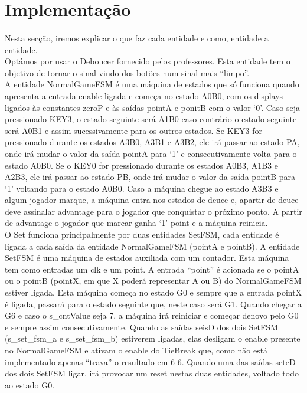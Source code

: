 \documentclass[a4paper, 11pt, oneside]{report}
\begin{document}
\section{Implementação}

\paragraph{} Nesta secção, iremos explicar o que faz cada entidade e como, entidade a entidade. \\
\indent Optámos por usar o Deboucer fornecido pelos professores. Esta entidade tem o objetivo de tornar o sinal vindo dos botões num sinal mais “limpo”. \\
\indent A entidade NormalGameFSM é uma máquina de estados que só funciona quando apresenta a entrada enable ligada e começa no estado A0B0, com os displays ligados às constantes zeroP e às saídas pointA e ponitB com o valor ‘0’. Caso seja pressionado KEY3, o estado seguinte será A1B0 caso contrário o estado seguinte será A0B1 e assim sucessivamente para os outros estados. Se KEY3 for pressionado durante os estados A3B0, A3B1 e A3B2, ele irá passar ao estado PA, onde irá mudar o valor da saída pointA para ‘1’ e consecutivamente volta para o estado A0B0. Se o KEY0 for pressionado durante os estados A0B3, A1B3 e A2B3, ele irá passar ao estado PB, onde irá mudar o valor da saída pointB para ‘1’ voltando para o estado A0B0. Caso a máquina chegue ao estado A3B3 e algum jogador marque, a máquina entra nos estados de deuce e, apartir de deuce deve assinalar advantage para o jogador que conquistar o próximo ponto. A partir de advantage o jogador que marcar ganha ‘1’ point e a máquina reinicia. \\
\indent O Set funciona principalmente por duas entidades SetFSM, cada entidade é ligada a cada saída da entidade NormalGameFSM (pointA e pointB). A entidade SetFSM é uma máquina de estados auxiliada com um contador. Esta máquina tem como entradas um clk e um point. A entrada “point” é acionada se o pointA ou o pointB (pointX, em que X poderá representar A ou B) do NormalGameFSM estiver ligada. Esta máquina começa no estado G0 e sempre que a entrada pointX é ligada, passará para o estado seguinte que, neste caso será G1. Quando chegar a G6 e caso o s\_cntValue seja 7, a máquina irá reiniciar e começar denovo pelo G0 e sempre assim consecutivamente. Quando as saídas seisD dos dois SetFSM (s\_set\_fsm\_a e s\_set\_fsm\_b) estiverem ligadas, elas desligam o enable presente no NormalGameFSM e ativam o enable do TieBreak que, como não está implementado apenas “trava” o resultado em 6-6. Quando uma das saídas seteD dos dois SetFSM ligar, irá provocar um reset nestas duas entidades, voltado todo ao estado G0. \\
\end{document}
